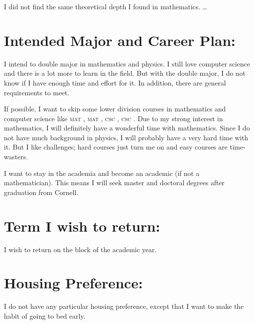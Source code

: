 	I did not find the same theoretical depth I found in mathematics.
	\dots
	
	\section*{Intended Major and Career Plan:}
	I intend to double major in mathematics and physics. I still love computer
	science and there is a lot more to learn in the field. But with the double
	major, I do not know if I have enough time and effort for it. In addition,
	there are general requirements to meet.
	
	If possible, I want to skip some lower division courses in mathematics and
	computer science like \textsc{mat} , \textsc{mat} ,
	\textsc{csc} , \textsc{csc} . Due to my strong interest in
	mathematics, I will definitely have a wonderful time with mathematics. Since I
	do not have much background in physics, I will probably have a very hard time
	with it. But I like challenges; hard courses just turn me on and easy courses
	are time-wasters.
	
	I want to stay in the academia and become an academic (if not a mathematician).
	This means I will seek master and doctoral degrees after graduation from
	Cornell.
	
	\section*{Term I wish to return:}
	I wish to return on the block  of the  academic year.
	
	\section*{Housing Preference:}
	I do not have any particular housing preference, except that I want to make the
	habit of going to bed early.
	
	\nocite{*}
	
	\clearpage
	
	\printbibliography
